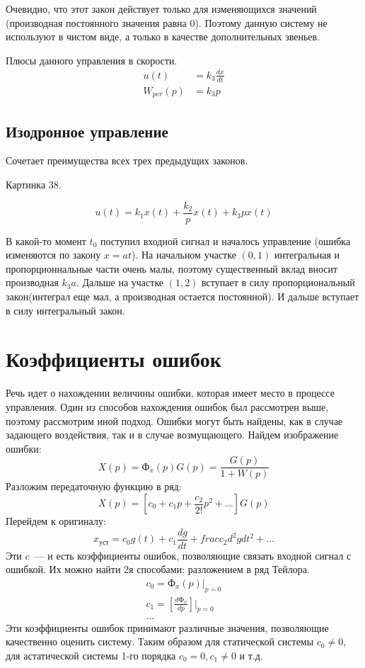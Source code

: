 Очевидно, что этот закон действует только для изменяющихся значений (производная постоянного значения равна 0). Поэтому данную систему не используют в чистом виде, а только в качестве дополнительных звеньев. 

Плюсы данного управления в скорости.
\begin{align*}
	u(t) &= k_3\frac{dx}{dt}\\
	W_{per}(p) &= k_3p
\end{align*}

\subsection{Изодронное управление}
Сочетает преимущества всех трех предыдущих законов.

Картинка 38.

$$
	u(t) = k_1x(t)+\frac{k_2}{p}x(t)+k_3px(t)
$$

В какой-то момент $t_0$ поступил входной сигнал и началось управление (ошибка изменяются по закону $x=at$). На начальном участке $(0,1)$ интегральная и пропорционнальные части очень малы, поэтому существенный вклад вносит производная $k_3a$. Дальше на участке $(1,2)$ вступает в силу пропорциональный закон(интеграл еще мал, а производная остается постоянной). И дальше вступает в силу интегральный закон.

\section{Коэффициенты ошибок}
Речь идет о нахождении величины ошибки, которая имеет место в процессе управления. Один из способов нахождения ошибок был рассмотрен выше, поэтому рассмотрим иной подход. Ошибки могут быть найдены, как в случае задающего воздействия, так и в случае возмущающего. Найдем изображение ошибки:
$$
	X(p)=\text{Ф}_x(p)G(p)=\frac{G(p)}{1+W(p)}
$$
Разложим передаточную функцию в ряд:
$$
	X(p)=[c_0+c_1p+\frac{c_2}{2!}p^2+\ldots]G(p)
$$
Перейдем к оригиналу:
$$
	x_{\text{уст}}=c_0g(t)+c_1\frac{dg}{dt}+frac{c_2d^2g}{dt^2}+\ldots
$$
Эти $c$~--- и есть коэффициенты ошибок, позволяющие связать входной сигнал с ошибкой. Их можно найти 2я способами: разложением в ряд Тейлора.
\begin{align*}
	c_0=\text{Ф}_x(p)|_{p=0} \\
	c_1=[\frac{d\text{Ф}_x}{dp}]|_{p=0} \\
	\dots
\end{align*}
Эти коэффициенты ошибок принимают различные значения, позволяющие качественно оценить систему. Таким образом для статической системы $c_0\neq0$, для астатической системы 1-го порядка $c_0=0,c_1\neq0$ и т.д.

